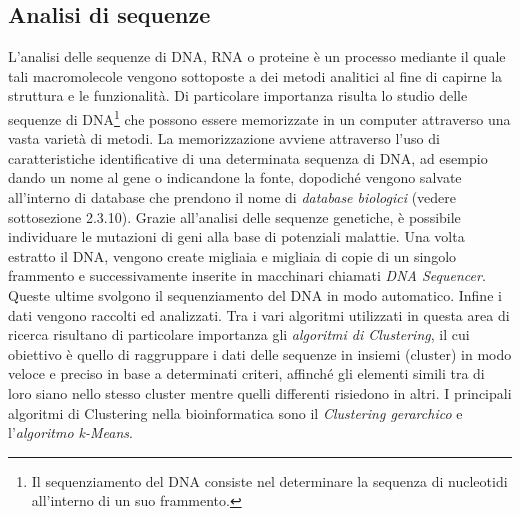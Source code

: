 \subsection{Analisi di sequenze}
L'analisi delle sequenze di DNA, RNA o proteine è un processo mediante il quale tali macromolecole vengono sottoposte a dei metodi analitici al fine di capirne la struttura e le funzionalità.
\newline
Di particolare importanza risulta lo studio delle sequenze di DNA\footnote{Il sequenziamento del DNA consiste nel determinare la sequenza di nucleotidi all'interno di un suo frammento.} che possono essere memorizzate in un computer attraverso una vasta varietà di metodi.
La memorizzazione avviene attraverso l'uso di caratteristiche identificative di una determinata sequenza di DNA, ad esempio dando un nome al gene o indicandone la fonte, dopodiché vengono salvate all'interno di database che prendono il nome di \textit{database biologici} (vedere sottosezione 2.3.10).
\newline
Grazie all'analisi delle sequenze genetiche, è possibile individuare le mutazioni di geni alla base di potenziali malattie.
\newline
Una volta estratto il DNA, vengono create migliaia e migliaia di copie di un singolo frammento e successivamente inserite in macchinari chiamati \textit{DNA Sequencer}. Queste ultime svolgono il sequenziamento del DNA in modo automatico. Infine i dati vengono raccolti ed analizzati.
\newline
Tra i vari algoritmi utilizzati in questa area di ricerca risultano di particolare importanza gli \textit{algoritmi di Clustering}, il cui obiettivo è quello di raggruppare i dati delle sequenze in insiemi (cluster) in modo veloce e preciso in base a determinati criteri, affinché gli elementi simili tra di loro siano nello stesso cluster mentre quelli differenti risiedono in altri. I principali algoritmi di Clustering nella bioinformatica sono il \textit{Clustering gerarchico} e l'\textit{algoritmo k-Means}.

